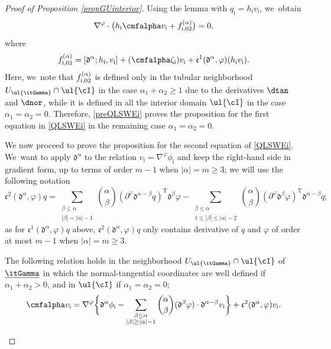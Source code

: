 \begin{proof}[Proof of Proposition \ref{propGUinterior}]
Using the lemma with $q_\mathrm{i}=h_\mathrm{i}v_\mathrm{i}$, we~obtain
\begin{equation}\label{preQLSWEi}
\nabla^\varphi\cdot\bigl(h_\mathrm{i} \cmfalpha v_\mathrm{i} + f_{{\rm i},02}^{(\alpha)} \bigr)=0,
\end{equation}
where
\begin{equation}\label{deffi02}
f_{{\rm i},02}^{(\alpha)}
= [\mathfrak{d}^{\alpha}; h_\mathrm{i},v_\mathrm{i}] + (\cmfalpha \zeta_\mathrm{i})v_\mathrm{i} + \mathfrak{c}^1({\mathfrak d}^\alpha,\varphi)(h_\mathrm{i} v_\mathrm{i}).
\end{equation}
Here, we~note that $f_{{\rm i},02}^{(\alpha)}$ is defined only in the tubular neighborhood $U_{\ul{\itGamma}}\cap\ul{\cI}$ in the case $\alpha_1+\alpha_2\geq1$
due to the derivatives $\dtan$ and $\dnor$, while it is defined in all the interior domain $\ul{\cI}$ in the case $\alpha_1=\alpha_2=0$.
Therefore, \eqref{preQLSWEi} proves the proposition for the first equation in \eqref{QLSWEi} in the remaining case $\alpha_1=\alpha_2=0$.

We now proceed to prove the proposition for the second equation of \eqref{QLSWEi}. We~want to apply ${\mathfrak d}^\alpha$ to the relation $v_\mathrm{i}=\nabla^\varphi \phi_\mathrm{i}$ and keep the right-hand side in gradient form,
up to terms of order $m-1$ when $|\alpha|=m\geq 3$; we will use the following notation
\[
\mathfrak{c}^2({\mathfrak d}^\alpha,\varphi)q=
\sum_{\substack{\beta\leq\alpha\\ |\beta|=|\alpha|-1}} \binom{\alpha}{\beta} (\partial^\varphi\mathfrak{d}^{\alpha-\beta}q)^\mathrm{T}\mathfrak{d}^{\beta}\varphi
- \sum_{\substack{\beta\leq\alpha\\ 1\leq|\beta|\leq|\alpha|-2}} \binom{\alpha}{\beta}
(\partial^\varphi\mathfrak{d}^{\beta}\varphi)^\mathrm{T}\mathfrak{d}^{\alpha-\beta}q;
\]
as for $\mathfrak{c}^1({\mathfrak d}^\alpha,\varphi)q$ above,
$\mathfrak{c}^2({\mathfrak d}^\alpha,\varphi)q$ only contains derivative of $q$ and $\varphi$ of order at most $m-1$ when $\vert \alpha\vert=m\geq 3$.

\begin{lemma}
The following relation holds in the neighborhood $U_{\ul{\itGamma}}\cap \ul{\cI}$ of $\underline{\itGamma}$
in which the normal-tangential coordinates are well defined if $\alpha_1+\alpha_2>0$, and in $\ul{\cI}$ if $\alpha_1=\alpha_2=0$;
\begin{equation}\label{preQLSWEi2}
\cmfalpha v_\mathrm{i}= \nabla^\varphi\biggl\{ \mathfrak{d}^{\alpha}\phi_\mathrm{i}
- \sum_{\substack{\beta\leq\alpha\\ |\beta|\geq|\alpha|-1}} \binom{\alpha}{\beta} (\mathfrak{d}^{\beta}\varphi)\cdot\mathfrak{d}^{\alpha-\beta}v_\mathrm{i} \biggr\}
+\mathfrak{c}^2({\mathfrak d}^\alpha,\varphi)v_\mathrm{i}.
\end{equation}
\end{lemma}


\end{proof}
